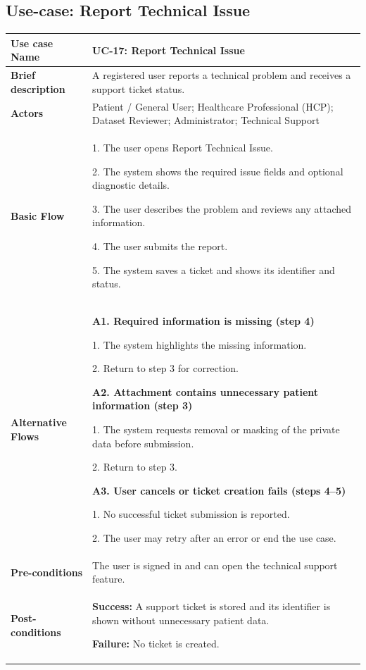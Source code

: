 
\subsection{Use-case: Report Technical Issue}
\label{uc:uc-17}
\begin{longtable}{|p{}|p{}|}
\hline
\textbf{Use case Name} & UC-17: Report Technical Issue \\ \hline
\textbf{Brief description} & A registered user reports a technical problem and receives a support ticket status. \\ \hline
\textbf{Actors} & Patient / General User; Healthcare Professional (HCP); Dataset Reviewer; Administrator; Technical Support \\ \hline
\textbf{Basic Flow} &
1. The user opens Report Technical Issue.\par
2. The system shows the required issue fields and optional diagnostic details.\par
3. The user describes the problem and reviews any attached information.\par
4. The user submits the report.\par
5. The system saves a ticket and shows its identifier and status.
\\ \hline
\textbf{Alternative Flows} &
\textbf{A1. Required information is missing (step 4)}\par
1. The system highlights the missing information.\par
2. Return to step 3 for correction.
\par\smallskip
\textbf{A2. Attachment contains unnecessary patient information (step 3)}\par
1. The system requests removal or masking of the private data before submission.\par
2. Return to step 3.
\par\smallskip
\textbf{A3. User cancels or ticket creation fails (steps 4--5)}\par
1. No successful ticket submission is reported.\par
2. The user may retry after an error or end the use case.
\\ \hline
\textbf{Pre-conditions} & The user is signed in and can open the technical support feature. \\ \hline
\textbf{Post-conditions} & \textbf{Success:} A support ticket is stored and its identifier is shown without unnecessary patient data.\par
\textbf{Failure:} No ticket is created. \\ \hline
\end{longtable}


